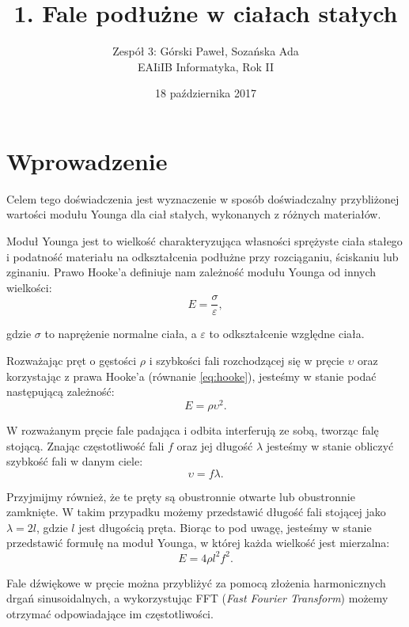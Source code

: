 \documentclass[12pt,a4paper]{article}
\title{1. Fale podłużne w ciałach stałych}
\date{18 października 2017}
\author{
	Zespół 3: Górski Paweł, Sozańska Ada\\
	EAIiIB Informatyka, Rok II
}
\numberwithin{equation}{section}
\begin{document}
\maketitle
\section{Wprowadzenie}
Celem tego doświadczenia jest wyznaczenie w sposób doświadczalny przybliżonej wartości modułu Younga dla ciał stałych, wykonanych z różnych materiałów. 

Moduł Younga jest to wielkość charakteryzująca własności sprężyste ciała stałego i podatność materiału na odkształcenia podłużne przy rozciąganiu, ściskaniu lub zginaniu. Prawo Hooke'a definiuje nam zależność modułu Younga od innych wielkości:
\begin{equation}
	E = \frac{\sigma}{\varepsilon},
	\label{eq:hooke}
\end{equation}

gdzie $\sigma$ to naprężenie normalne ciała, a $\varepsilon$ to odkształcenie względne ciała.

Rozważając pręt o gęstości $\rho$ i szybkości fali rozchodzącej się w pręcie $\upsilon$ oraz korzystając z prawa Hooke'a (równanie \ref{eq:hooke}), jesteśmy w stanie podać następującą zależność:
\begin{equation}
	E = \rho \upsilon^2.
	\label{eq:young}
\end{equation}

W rozważanym pręcie fale padająca i odbita interferują ze sobą, tworząc falę stojącą. Znając częstotliwość fali $f$ oraz jej długość $\lambda$ jesteśmy w stanie obliczyć szybkość fali w danym ciele:
\begin{equation}
	\upsilon = f\lambda.
	\label{eq:v}
\end{equation}

Przyjmijmy również, że te pręty są obustronnie otwarte lub obustronnie zamknięte. W takim przypadku możemy przedstawić długość fali stojącej jako $\lambda = 2l$, gdzie $l$ jest długością pręta. Biorąc to pod uwagę, jesteśmy w stanie przedstawić formułę na moduł Younga, w której każda wielkość jest mierzalna:
\begin{equation}
	E = 4\rho l^2 f^2.
\end{equation}

Fale dźwiękowe w pręcie można przybliżyć za pomocą złożenia harmonicznych drgań sinusoidalnych, a wykorzystując FFT (\emph{Fast Fourier Transform}) możemy otrzymać odpowiadające im częstotliwości. 
\end{document}
